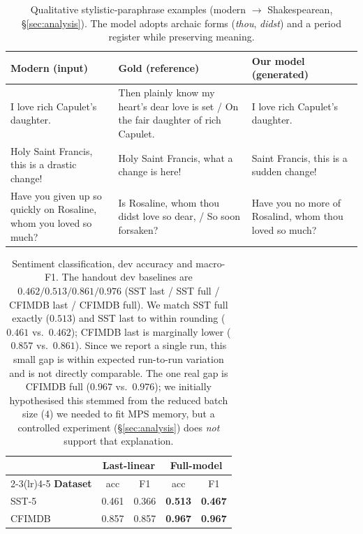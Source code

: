 \documentclass[10pt,twocolumn]{article}
\newcommand{\best}[1]{\textbf{#1}}
\begin{document}
\begin{table}[t]
\centering
\small
\begin{tabular}{@{}p{}p{}p{}@{}}
\toprule
\textbf{Modern (input)} & \textbf{Gold (reference)} & \textbf{Our model (generated)} \\
\midrule
I love rich Capulet's daughter.
& Then plainly know my heart's dear love is set / On the fair daughter of rich Capulet.
& I love rich Capulet's daughter. \\[0.4em]
Holy Saint Francis, this is a drastic change!
& Holy Saint Francis, what a change is here!
& Saint Francis, this is a sudden change! \\[0.4em]
Have you given up so quickly on Rosaline, whom you loved so much?
& Is Rosaline, whom thou didst love so dear, / So soon forsaken?
& Have you no more of Rosalind, whom thou loved so much? \\
\bottomrule
\end{tabular}
\caption{Qualitative stylistic-paraphrase examples (modern $\rightarrow$
Shakespearean, \S\ref{sec:analysis}). The model adopts archaic forms
(\emph{thou}, \emph{didst}) and a period register while preserving meaning.}
\label{tab:qual}
\end{table}

\begin{table}[t]
\centering
\small
\begin{tabular}{@{}lcccc@{}}
\toprule
& \multicolumn{2}{c}{\textbf{Last-linear}} & \multicolumn{2}{c}{\textbf{Full-model}} \\
\cmidrule(lr){2-3}\cmidrule(lr){4-5}
\textbf{Dataset} & acc & F1 & acc & F1 \\
\midrule
SST-5  & 0.461 & 0.366 & \best{0.513} & \best{0.467} \\
CFIMDB & 0.857 & 0.857 & \best{0.967} & \best{0.967} \\
\bottomrule
\end{tabular}
\caption{Sentiment classification, dev accuracy and macro-F1. The handout dev
baselines are $0.462 / 0.513 / 0.861 / 0.976$ (SST last / SST full / CFIMDB last /
CFIMDB full). We match SST full exactly ($0.513$) and SST last to within rounding
($0.461$ vs.\ $0.462$); CFIMDB last is marginally lower ($0.857$ vs.\ $0.861$).
Since we report a single run, this small gap is within expected run-to-run
variation and is not directly comparable. The one real gap is CFIMDB full
($0.967$ vs.\ $0.976$); we initially hypothesised this stemmed from the reduced
batch size ($4$) we needed to fit MPS memory, but a controlled experiment
(\S\ref{sec:analysis}) does \emph{not} support that explanation.}
\label{tab:sentiment}
\end{table}
\end{document}
